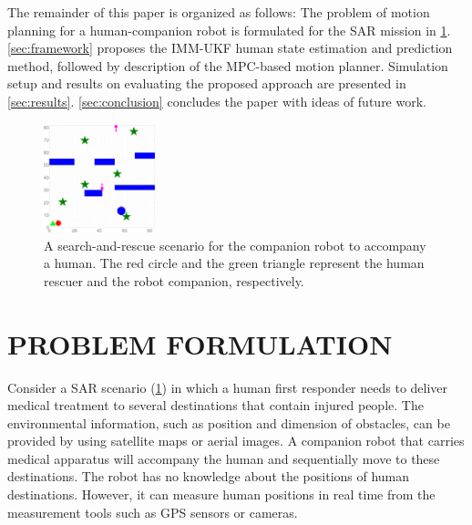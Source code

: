 \documentclass[letterpaper, 10 pt, conference]{ieeeconf}
\begin{document}
	The remainder of this paper is organized as follows:
	The problem of motion planning for a human-companion robot is formulated for the SAR mission in \cref{sec:formulation}.
	\cref{sec:framework} proposes the IMM-UKF human state estimation and prediction method, followed by description of the MPC-based motion planner.
	Simulation setup and results on evaluating the proposed approach are presented in \cref{sec:results}.
	\cref{sec:conclusion} concludes the paper with ideas of future work.
	
	\begin{figure}
		\centering		
		\includegraphics[width=0.29\textwidth]{figures/sim_traj_init}		
		\caption{A search-and-rescue scenario for the companion robot to accompany a human. The red circle and the green triangle represent the human rescuer and the robot companion, respectively.}
		\label{fig:ref_traj_init}
	\end{figure}
	
	\section{PROBLEM FORMULATION}\label{sec:formulation}
	Consider a SAR scenario (\cref{fig:ref_traj_init}) in which a human first responder needs to deliver medical treatment to several destinations that contain injured people. 
	The environmental information, such as position and dimension of obstacles, can be provided by using satellite maps or aerial images.
	A companion robot that carries medical apparatus will accompany the human and sequentially move to these destinations.
	The robot has no knowledge about the positions of human destinations.
	However, it can measure human positions in real time from the measurement tools such as GPS sensors or cameras.
	
\end{document}
